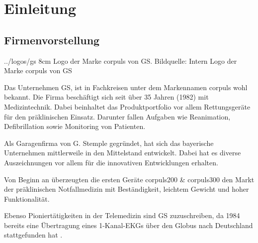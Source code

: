 \chapter{Einleitung}
\label{einleitung}
\minitoc\pagebreak


\section{Firmenvorstellung}
\bild
{../logos/gs}
{8cm}
{Logo der Marke \glqq corpuls\grqq{} von \acrlong*{GS}. Bildquelle: Intern}
{Logo der Marke \glqq corpuls\grqq{} von GS}

Das Unternehmen \gls{GS}, ist in Fachkreisen unter dem Markennamen \glqq corpuls\grqq{} wohl bekannt. 
Die Firma beschäftigt sich seit über 35 Jahren (1982) mit Medizintechnik.
Dabei beinhaltet das Produktportfolio vor allem Rettungsgeräte für den präklinischen Einsatz.
Darunter fallen Aufgaben wie Reanimation, Defibrillation sowie Monitoring von Patienten. 

Als Garagenfirma von G. Stemple gegründet, hat sich das bayerische Unternehmen mittlerweile in den Mittelstand entwickelt.
Dabei hat es diverse Auszeichnungen vor allem für die innovativen Entwicklungen erhalten.

Von Beginn an überzeugten die ersten Geräte corpuls200 \& corpuls300 den Markt der präklinischen Notfallmedizin mit Beständigkeit, leichtem Gewicht und hoher Funktionalität. 

Ebenso Pioniertätigkeiten in der Telemedizin sind \gls{GS} zuzuschreiben, da 1984 bereits eine Übertragung eines 1-Kanal-EKGs über den Globus nach Deutschland stattgefunden hat \cite{GSElektromedizinischeGerateG.StempleGmbH.}.


